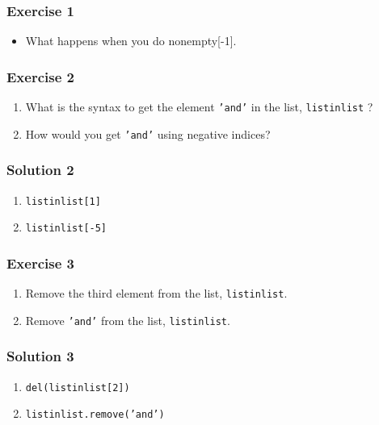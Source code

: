\documentclass[17pt,compress]{beamer}
\begin{document}
\begin{frame}
\frametitle{Exercise 1}
\begin{itemize}
\item What happens when you do nonempty[-1].
\end{itemize}
\end{frame}
\begin{frame}
\frametitle{Exercise 2}
\begin{enumerate}
\item What is the syntax to get the element \texttt{'and'} in the list, \texttt{listinlist} ?\pause
\item How would you get \texttt{'and'} using negative indices?
\end{enumerate}
\end{frame}
\begin{frame}[fragile]
\frametitle{Solution 2}
\begin{enumerate}
\item \texttt{listinlist[1]}\pause
\item \texttt{listinlist[-5]}
\end{enumerate}
\end{frame}
\begin{frame}
\frametitle{Exercise 3}
\begin{enumerate}
\item Remove the third element from the list, \texttt{listinlist}.\pause
\item Remove \texttt{'and'} from the list, \texttt{listinlist}.
\end{enumerate}
\end{frame}
\begin{frame}[fragile]
\frametitle{Solution 3}
\begin{enumerate}
\item \texttt{del(listinlist[2])}\pause
\item \texttt{listinlist.remove('and')}
\end{enumerate}
\end{frame}
\end{document}
